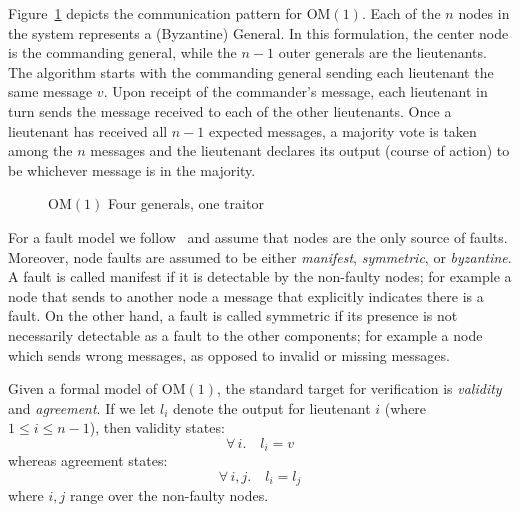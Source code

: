 \documentclass{llncs/llncs}
\newcommand{\OM}[1]{\ensuremath{\mathrm{OM}(#1)}}
\begin{document}
Figure~\ref{fig:om1} depicts the communication pattern for \OM{1}. Each of the
$n$ nodes in the system represents a (Byzantine) General. In this formulation, the
center node is the commanding general, while the $n-1$ outer generals are the
lieutenants. The algorithm starts with the commanding general sending each
lieutenant the same message $v$. Upon receipt of the commander's message, each
lieutenant in turn sends the message received to each of the other lieutenants.
Once a lieutenant has received all $n-1$ expected messages, a majority vote is
taken among the $n$ messages and the lieutenant declares its output (course of
action) to be whichever message is in the majority.

\begin{figure}[ht]
\centering
{}
\caption{\OM{1} Four generals, one traitor}
\label{fig:om1}
\end{figure}

For a fault model we follow~\cite{Rushby-OM1} and assume that nodes are the
only source of faults. Moreover, node faults are assumed to be either
\emph{manifest}, \emph{symmetric}, or \emph{byzantine}. A fault is called manifest if
it is detectable by the non-faulty nodes; for example a node that sends to
another node a message that explicitly indicates there is a fault. On the
other hand, a fault is called symmetric if its presence is not necessarily
detectable as a fault to the other components; for example a node which sends
wrong messages, as opposed to invalid or missing messages.

Given a formal model of \OM{1}, the standard target for verification is
\emph{validity} and \emph{agreement}. If we let $l_i$ denote the output for
lieutenant $i$ (where $1 \le i \le n-1$), then validity states:
%
\begin{equation}
    \forall \,i. \quad l_i = v
\end{equation}
%
whereas agreement states:
%
\begin{equation}
    \forall \,i, j. \quad l_i = l_j
\end{equation}
%
where $i,j$ range over the non-faulty nodes.
\end{document}
